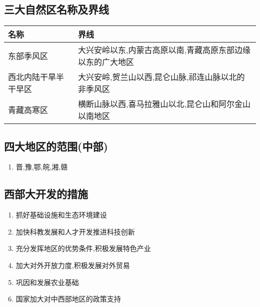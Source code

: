 \documentclass[a4paper]{article}
\begin{document}
    \subsection{三大自然区名称及界线}
    \begin{table}[h]
        \begin{tabular}{|l|l|}
            \hline
            名称    &   界线    \\
            \hline
            东部季风区  &   大兴安岭以东,内蒙古高原以南,青藏高原东部边缘以东的广大地区    \\
            \hline
            西北内陆干旱半干早区    &   大兴安岭,贺兰山以西,昆仑山脉,祁连山脉以北的非季风区   \\
            \hline
            青藏高寒区  &   横断山脉以西,喜马拉雅山以北,昆仑山和阿尔金山以南地区    \\
            \hline
        \end{tabular}
    \end{table}
    \subsection{四大地区的范围(中部)}
    \begin{enumerate}
        \item 晋,豫,鄂,皖,湘,赣
    \end{enumerate}
    \subsection{西部大开发的措施}
    \begin{enumerate}
        \item 抓好基础设施和生态环境建设
        \item 加快科教发展和人才开发推进科技创新
        \item 充分发挥地区的优势条件,积极发展特色产业
        \item 加大对外开放力度,积极发展对外贸易
        \item 巩因和发展农业基础
        \item 国家加大对中西部地区的政策支持
    \end{enumerate}
\end{document}
